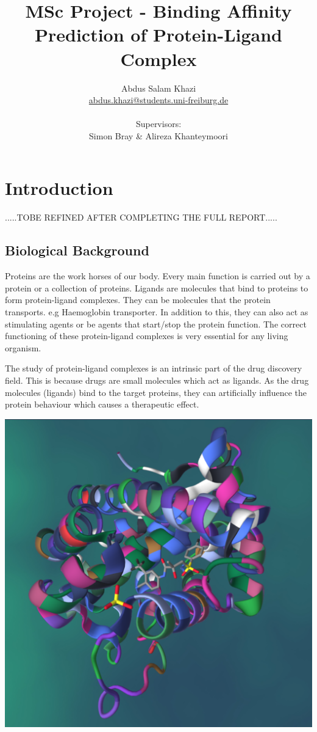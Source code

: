 \documentclass[11pt]{article}
\title{MSc Project - Binding Affinity Prediction of Protein-Ligand Complex}
\author{
        Abdus Salam Khazi\\
        \href{mailto:abdus.khazi@students.uni-freiburg.de}
                {abdus.khazi@students.uni-freiburg.de}\\ \\
        Supervisors:
        \begin{tabular}{ll}
			Simon Bray \&
			Alireza Khanteymoori
		\end{tabular}
       }
\begin{document}
\maketitle
\date{}
\tableofcontents
\newpage

\section{Introduction}
.....TOBE REFINED AFTER COMPLETING THE FULL REPORT.....

\subsection{Biological Background}
Proteins are the work horses of our body.
Every main function is carried out by a protein or a collection of proteins.
Ligands are molecules that bind to proteins to form protein-ligand complexes.
They can be molecules that the protein transports. e.g Haemoglobin transporter.
In addition to this, they can also act as stimulating agents or 
be agents that start/stop the protein function.
The correct functioning of these protein-ligand complexes is very essential for any living organism.

The study of protein-ligand complexes is an intrinsic part of the drug discovery field.
This is because drugs are small molecules which act as ligands.
As the drug molecules (ligands) bind to the target proteins, they can artificially influence
the protein behaviour which causes a therapeutic effect.

\includegraphics[scale=0.15]{pl_complex}
\cite{PL_complex_introduction}
\end{document}
